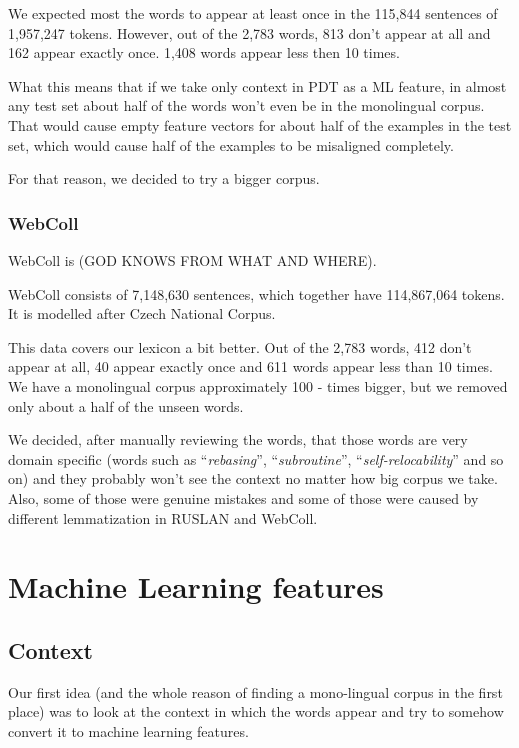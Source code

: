 \documentclass[letterpaper]{article}
\begin{document}
We expected most the words to appear at least once in the 115,844 sentences of 1,957,247 tokens. However, out of the 2,783 words, 813 don't appear at all and 162 appear exactly once. 1,408 words appear less then 10 times.

What this means that if we take only context in PDT as a ML feature, in almost any test set about half of the words won't even be in the monolingual corpus. That would cause empty feature vectors for about half of the examples in the test set, which would cause half of the examples to be misaligned completely.

For that reason, we decided to try a bigger corpus.

\subsubsection{WebColl}

WebColl is (GOD KNOWS FROM WHAT AND WHERE).

WebColl consists of 7,148,630 sentences, which together have 114,867,064 tokens. It is modelled after Czech National Corpus.

This data covers our lexicon a bit better. Out of the 2,783 words, 412 don't appear at all, 40 appear exactly once and 611 words appear less than 10 times. We have a monolingual corpus approximately 100 - times bigger, but we removed only about a half of the unseen words.

We decided, after manually reviewing the words, that those words are very domain specific (words such as ``\emph{rebasing}'', ``\emph{subroutine}'', ``\emph{self-relocability}'' and so on) and they probably won't see the context no matter how big corpus we take. Also, some of those were genuine mistakes and some of those were caused by different lemmatization in RUSLAN and WebColl.



\section{Machine Learning features}
\subsection{Context}
Our first idea (and the whole reason of finding a mono-lingual corpus in the first place) was to look at the context in which the words appear and try to somehow convert it to machine learning features.
\end{document}
